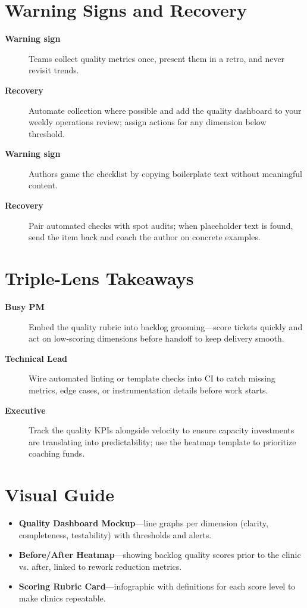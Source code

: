 \section{Warning Signs and Recovery}
\label{sec:quality-warning}
\begin{description}
    \item[\textbf{Warning sign}] Teams collect quality metrics once, present them in a retro, and never revisit trends.
    \item[\textbf{Recovery}] Automate collection where possible and add the quality dashboard to your weekly operations review; assign actions for any dimension below threshold.
    \item[\textbf{Warning sign}] Authors game the checklist by copying boilerplate text without meaningful content.
    \item[\textbf{Recovery}] Pair automated checks with spot audits; when placeholder text is found, send the item back and coach the author on concrete examples.
\end{description}

\section{Triple-Lens Takeaways}
\label{sec:quality-triple}

\begin{description}
    \item[\textbf{Busy PM}] Embed the quality rubric into backlog grooming—score tickets quickly and act on low-scoring dimensions before handoff to keep delivery smooth.
    \item[\textbf{Technical Lead}] Wire automated linting or template checks into CI to catch missing metrics, edge cases, or instrumentation details before work starts.
    \item[\textbf{Executive}] Track the quality KPIs alongside velocity to ensure capacity investments are translating into predictability; use the heatmap template to prioritize coaching funds.
\end{description}
\section{Visual Guide}
\label{sec:quality-visuals}
\begin{itemize}
    \item \textbf{Quality Dashboard Mockup}—line graphs per dimension (clarity, completeness, testability) with thresholds and alerts.
    \item \textbf{Before/After Heatmap}—showing backlog quality scores prior to the clinic vs. after, linked to rework reduction metrics.
    \item \textbf{Scoring Rubric Card}—infographic with definitions for each score level to make clinics repeatable.
\end{itemize}

